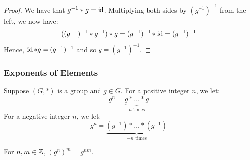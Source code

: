 \documentclass[letterpaper]{article}
\begin{document}
\begin{mdframed}
    \begin{proof}
        We have that $g^{-1} * g = \operatorname{id}$. Multiplying both sides by $(g^{-1})^{-1}$ from the left, we now have: 
        \[((g^{-1})^{-1} * g^{-1}) * g = (g^{-1})^{-1} * \operatorname{id} = (g^{-1})^{-1}\]
        Hence, $\operatorname{id} * g = (g^{-1})^{-1}$ and so $g = (g^{-1})^{-1}$.     
    \end{proof}
\end{mdframed}

\subsubsection{Exponents of Elements}
Suppose $(G, *)$ is a group and $g \in G$. For a positive integer $n$, we let: 
\[g^n = \underbrace{g * \dots * g}_{n \text{ times}}\]
For a negative integer $n$, we let: 
\[g^n = \underbrace{(g^{-1}) * \dots * (g^{-1})}_{-n \text{ times}}\]

\begin{lemma}{}{}
    For $n, m \in \mathbb{Z}$, $(g^n)^m = g^{nm}$. 
\end{lemma}
\end{document}
